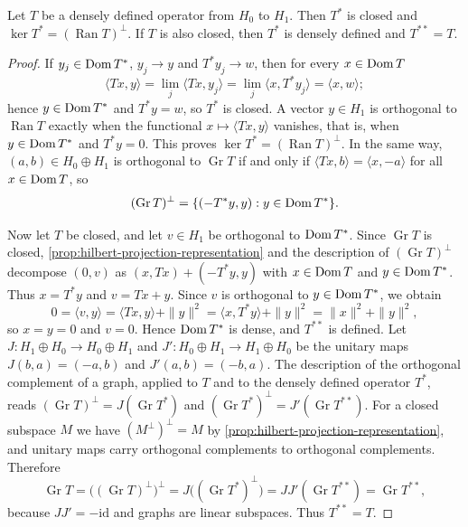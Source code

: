 \begin{lemma}\label{lem:closed-operator-adjoint}
Let $T$ be a densely defined operator from $H_0$ to $H_1$. Then $T^*$ is closed and $\ker T^*=(\operatorname{Ran}T)^\perp$. If $T$ is also closed, then $T^*$ is densely defined and $T^{**}=T$.
\end{lemma}
\begin{proof}
If $y_j\in\operatorname{Dom} T^*$, $y_j\to y$ and $T^*y_j\to w$, then for every $x\in\operatorname{Dom} T$
\[
 \langle Tx,y\rangle=\lim_j\langle Tx,y_j\rangle=\lim_j\langle x,T^*y_j\rangle=\langle x,w\rangle;
\]
hence $y\in\operatorname{Dom} T^*$ and $T^*y=w$, so $T^*$ is closed. A vector $y\in H_1$ is orthogonal to $\operatorname{Ran}T$ exactly when the functional $x\mapsto\langle Tx,y\rangle$ vanishes, that is, when $y\in\operatorname{Dom} T^*$ and $T^*y=0$. This proves $\ker T^*=(\operatorname{Ran}T)^\perp$. In the same way, $(a,b)\in H_0\oplus H_1$ is orthogonal to $\operatorname{Gr}T$ if and only if $\langle Tx,b\rangle=\langle x,-a\rangle$ for all $x\in\operatorname{Dom} T$, so
\[
 (\operatorname{Gr}T)^\perp
       =\{(-T^*y,y):y\in\operatorname{Dom} T^*\}.
\]

Now let $T$ be closed, and let $v\in H_1$ be orthogonal to $\operatorname{Dom} T^*$. Since $\operatorname{Gr}T$ is closed, \cref{prop:hilbert-projection-representation} and the description of $(\operatorname{Gr}T)^\perp$ decompose $(0,v)$ as $(x,Tx)+(-T^*y,y)$ with $x\in\operatorname{Dom} T$ and $y\in\operatorname{Dom} T^*$. Thus $x=T^*y$ and $v=Tx+y$. Since $v$ is orthogonal to $y\in\operatorname{Dom} T^*$, we obtain
\[
 0=\langle v,y\rangle=\langle Tx,y\rangle+\|y\|^2=\langle x,T^*y\rangle+\|y\|^2=\|x\|^2+\|y\|^2,
\]
so $x=y=0$ and $v=0$. Hence $\operatorname{Dom} T^*$ is dense, and $T^{**}$ is defined. Let $J\colon H_1\oplus H_0\to H_0\oplus H_1$ and $J'\colon H_0\oplus H_1\to H_1\oplus H_0$ be the unitary maps $J(b,a)=(-a,b)$ and $J'(a,b)=(-b,a)$. The description of the orthogonal complement of a graph, applied to $T$ and to the densely defined operator $T^*$, reads $(\operatorname{Gr}T)^\perp=J(\operatorname{Gr}T^*)$ and $(\operatorname{Gr}T^*)^\perp=J'(\operatorname{Gr}T^{**})$. For a closed subspace $M$ we have $(M^\perp)^\perp=M$ by \cref{prop:hilbert-projection-representation}, and unitary maps carry orthogonal complements to orthogonal complements. Therefore
\[
 \operatorname{Gr}T=\bigl((\operatorname{Gr}T)^\perp\bigr)^\perp
 =J\bigl((\operatorname{Gr}T^*)^\perp\bigr)
 =JJ'(\operatorname{Gr}T^{**})=\operatorname{Gr}T^{**},
\]
because $JJ'=-\mathrm{id}$ and graphs are linear subspaces. Thus $T^{**}=T$.
\end{proof}

